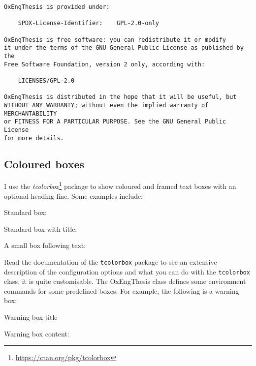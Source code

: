 \begin{lstlisting}[style=custom-verbatim,caption={License information.}]
OxEngThesis is provided under:

    SPDX-License-Identifier:    GPL-2.0-only
    
OxEngThesis is free software: you can redistribute it or modify
it under the terms of the GNU General Public License as published by the
Free Software Foundation, version 2 only, according with:

    LICENSES/GPL-2.0

OxEngThesis is distributed in the hope that it will be useful, but
WITHOUT ANY WARRANTY; without even the implied warranty of MERCHANTABILITY
or FITNESS FOR A PARTICULAR PURPOSE. See the GNU General Public License
for more details.
\end{lstlisting}


\subsection{Coloured boxes}

I use the \textit{tcolorbox}\footnote{\url{https://ctan.org/pkg/tcolorbox}} package to show coloured and framed text boxes with an optional heading line. Some examples include:

\noindent Standard box:

\begin{tcolorbox}
\lipsum[1]
\end{tcolorbox}

\noindent Standard box with title:

\begin{tcolorbox}[title=Box title]
\lipsum[1]
\end{tcolorbox}


\noindent A small box following text:\dotfill{}\hfill

Read the documentation of the \verb|tcolorbox| package to see an extensive description of the configuration options and what you can do with the \verb|tcolorbox| class, it is quite customisable. The OxEngThesis class defines some environment commands for some predefined boxes. For example, the following is a warning box:

\begin{OxWarningBox}{Warning box title}

Warning box content: \lipsum[1]

\end{OxWarningBox}


